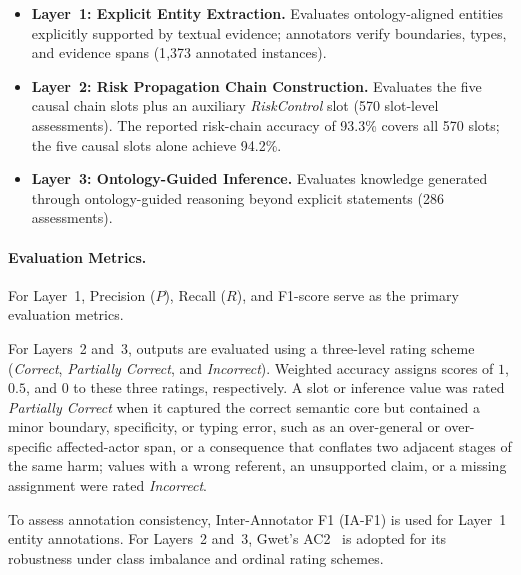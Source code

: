 \documentclass[a4paper,fleqn]{cas-dc}
\begin{document}
\begin{itemize}
  \item \textbf{Layer~1: Explicit Entity Extraction.}
        Evaluates ontology-aligned entities explicitly supported by
        textual evidence; annotators verify boundaries, types, and
        evidence spans (1{,}373 annotated instances).

  \item \textbf{Layer~2: Risk Propagation Chain Construction.}
        Evaluates the five causal chain slots plus an auxiliary
        \textit{RiskControl} slot (570 slot-level assessments).
        The reported risk-chain accuracy of 93.3\% covers all 570
        slots; the five causal slots alone achieve 94.2\%.

  \item \textbf{Layer~3: Ontology-Guided Inference.}
        Evaluates knowledge generated through ontology-guided
        reasoning beyond explicit statements (286 assessments).
\end{itemize}

\paragraph{Evaluation Metrics.}
For Layer~1, Precision ($P$), Recall ($R$), and F1-score serve
as the primary evaluation metrics.

For Layers~2 and~3, outputs are evaluated using a three-level rating
scheme (\textit{Correct}, \textit{Partially Correct}, and
\textit{Incorrect}). Weighted accuracy assigns scores of $1$, $0.5$, and
$0$ to these three ratings, respectively.
A slot or inference value was rated \textit{Partially Correct} when
it captured the correct semantic core but contained a minor boundary,
specificity, or typing error, such as an over-general or
over-specific affected-actor span, or a consequence that conflates
two adjacent stages of the same harm; values with a wrong referent,
an unsupported claim, or a missing assignment were rated
\textit{Incorrect}.

To assess annotation consistency, Inter-Annotator F1 (IA-F1) is used
for Layer~1 entity annotations. For Layers~2 and~3, Gwet's
AC2~\cite{gwet2008ac2} is
adopted for its robustness under class imbalance and ordinal
rating schemes.
\end{document}
